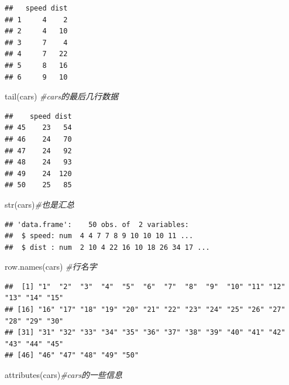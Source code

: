 \documentclass[
]{book}
\newenvironment{Shaded}{\begin{snugshade}}{\end{snugshade}}
\newcommand{\CommentTok}[1]{\textcolor[rgb]{0.56,0.35,0.01}{\textit{#1}}}
\newcommand{\FunctionTok}[1]{\textcolor[rgb]{0.00,0.00,0.00}{#1}}
\newcommand{\NormalTok}[1]{#1}
\begin{document}
\begin{verbatim}
##   speed dist
## 1     4    2
## 2     4   10
## 3     7    4
## 4     7   22
## 5     8   16
## 6     9   10
\end{verbatim}

\begin{Shaded}
\begin{Highlighting}[]
\FunctionTok{tail}\NormalTok{(cars) }\CommentTok{\#cars的最后几行数据}
\end{Highlighting}
\end{Shaded}

\begin{verbatim}
##    speed dist
## 45    23   54
## 46    24   70
## 47    24   92
## 48    24   93
## 49    24  120
## 50    25   85
\end{verbatim}

\begin{Shaded}
\begin{Highlighting}[]
\FunctionTok{str}\NormalTok{(cars)}\CommentTok{\#也是汇总}
\end{Highlighting}
\end{Shaded}

\begin{verbatim}
## 'data.frame':    50 obs. of  2 variables:
##  $ speed: num  4 4 7 7 8 9 10 10 10 11 ...
##  $ dist : num  2 10 4 22 16 10 18 26 34 17 ...
\end{verbatim}

\begin{Shaded}
\begin{Highlighting}[]
\FunctionTok{row.names}\NormalTok{(cars) }\CommentTok{\#行名字}
\end{Highlighting}
\end{Shaded}

\begin{verbatim}
##  [1] "1"  "2"  "3"  "4"  "5"  "6"  "7"  "8"  "9"  "10" "11" "12" "13" "14" "15"
## [16] "16" "17" "18" "19" "20" "21" "22" "23" "24" "25" "26" "27" "28" "29" "30"
## [31] "31" "32" "33" "34" "35" "36" "37" "38" "39" "40" "41" "42" "43" "44" "45"
## [46] "46" "47" "48" "49" "50"
\end{verbatim}

\begin{Shaded}
\begin{Highlighting}[]
\FunctionTok{attributes}\NormalTok{(cars)}\CommentTok{\#cars的一些信息}
\end{Highlighting}
\end{Shaded}
\end{document}
